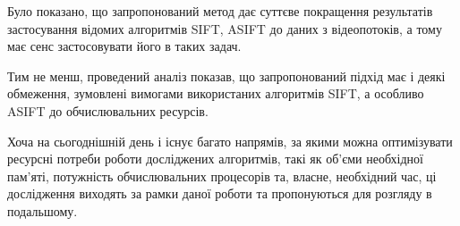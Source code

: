 Було показано, що запропонований метод дає суттєве покращення результатів застосування відомих алгоритмів SIFT, ASIFT до даних з відеопотоків, а тому має сенс застосовувати його в таких задач. 

Тим не менш, проведений аналіз показав, що запропонований підхід має і деякі обмеження, зумовлені вимогами використаних алгоритмів SIFT, а особливо ASIFT до обчислювальних ресурсів. 

Хоча на сьогоднішній день і існує багато напрямів, за якими можна оптимізувати ресурсні потреби роботи досліджених алгоритмів, такі як об'єми необхідної пам'яті, потужність обчислювальних процесорів та, власне, необхідний час, ці дослідження виходять за рамки даної роботи та пропонуються для розгляду в подальшому.

